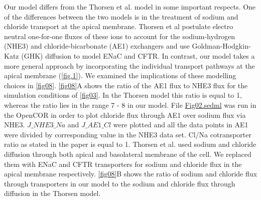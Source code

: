 \documentclass[fleqn,10pt]{physiome}
\begin{document}
Our model differs from the Thorsen et al. model \citep{thorsen2014transepithelial} in some
important respects. One of the differences between the two models is in the
treatment of sodium and chloride transport at the apical membrane. Thorsen
et al postulate electro neutral one-for-one fluxes of these ions to account for the
sodium-hydrogen (NHE3) and chloride-bicarbonate (AE1) exchangers and use
Goldman-Hodgkin-Katz (GHK) diffusion to model ENaC and CFTR. In contrast,
our model takes a more general approach by incorporating the individual
transport pathways at the apical membrane (\autoref{fig.1}). We examined the
implications of these modelling choices in \autoref{fig08}. \autoref{fig08}A shows the
ratio of the AE1 flux to NHE3 flux for the simulation conditions of \autoref{fig03}.
In the Thorsen model this ratio is equal to 1, whereas the ratio lies in the range
7 - 8 in our model. File \href{https://models.physiomeproject.org/workspace/572/file/057757b3a8de9a56b4bd32b8a12a0f00af1d8213/SEDML_files/Fig02.sedml}{Fig02.sedml} was run in the OpenCOR in order to plot chloride flux through AE1 over sodium flux via NHE3. $J\_{NHE3}\_{Na}$ and $J\_{AE1}\_{Cl}$ were plotted and all the data points in AE1 were divided by corresponding value in the NHE3 data set. Cl/Na cotransporter ratio as stated in the paper is equal to 1. Thorsen et al. used sodium and chloride diffusion through both apical and basolateral membrane of the cell. We replaced them with ENaC and CFTR transporters for sodium and chloride flux in the apical membrane respectively. \autoref{fig08}B shows the ratio of sodium and chloride flux through transporters in our model to the sodium and chloride flux through diffusion in the Thorsen model.\newline
\end{document}
